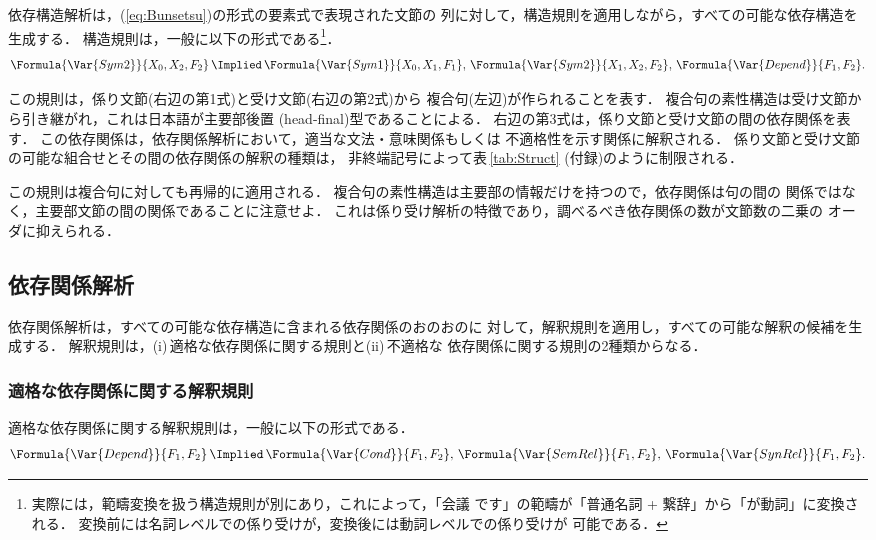 依存構造解析は，(\ref{eq:Bunsetsu})の形式の要素式で表現された文節の
列に対して，構造規則を適用しながら，すべての可能な依存構造を生成する．
構造規則は，一般に以下の形式である\footnote{
  実際には，範疇変換を扱う構造規則が別にあり，これによって，「会議
です」の範疇が「普通名詞 + 繋辞」から「が動詞」に変換される．
変換前には名詞レベルでの係り受けが，変換後には動詞レベルでの係り受けが
可能である．
}．
\begin{equation}\label{eq:Struct}
\begin{array}[t]{@{}l@{}}
  \Formula{\Var{Sym2}}{X_0,X_2,F_2}\,\Implied\,
\Formula{\Var{Sym1}}{X_0,X_1,F_1},\,
\Formula{\Var{Sym2}}{X_1,X_2,F_2},\,
\Formula{\Var{Depend}}{F_1,F_2}.
\end{array}
\end{equation}

この規則は，係り文節(右辺の第1式)と受け文節(右辺の第2式)から
複合句(左辺)が作られることを表す．
複合句の素性構造は受け文節から引き継がれ，これは日本語が主要部後置
(head-final)型であることによる．
右辺の第3式は，係り文節と受け文節の間の依存関係を表す．
この依存関係は，依存関係解析において，適当な文法・意味関係もしくは
不適格性を示す関係に解釈される．
係り文節と受け文節の可能な組合せとその間の依存関係の解釈の種類は，
非終端記号によって表\,\ref{tab:Struct} (付録)のように制限される．

この規則は複合句に対しても再帰的に適用される．
複合句の素性構造は主要部の情報だけを持つので，依存関係は句の間の
関係ではなく，主要部文節の間の関係であることに注意せよ．
これは係り受け解析の特徴であり，調べるべき依存関係の数が文節数の二乗の
オーダに抑えられる．

\subsection{依存関係解析}\label{sec:Uniform:Depend}

依存関係解析は，すべての可能な依存構造に含まれる依存関係のおのおのに
対して，解釈規則を適用し，すべての可能な解釈の候補を生成する．
解釈規則は，(i)\,適格な依存関係に関する規則と(ii)\,不適格な
依存関係に関する規則の2種類からなる．

\subsubsection{適格な依存関係に関する解釈規則}
\label{sec:Uniform:Depend:Well-formed}

適格な依存関係に関する解釈規則は，一般に以下の形式である．
\begin{equation}\label{eq:Well-formed}
\begin{array}[t]{@{}l@{}}
  \Formula{\Var{Depend}}{F_1,F_2}\,\Implied\,
\Formula{\Var{Cond}}{F_1,F_2},\,
\Formula{\Var{SemRel}}{F_1,F_2},\,
\Formula{\Var{SynRel}}{F_1,F_2}.
\end{array}
\end{equation}

